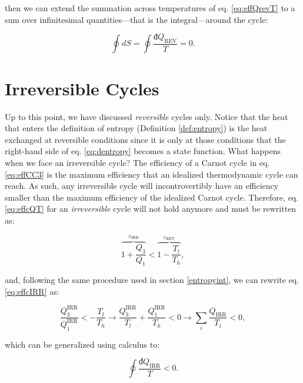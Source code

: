 \documentclass[
  9pt,
]{extbook}
\theoremstyle{definition}
\theoremstyle{definition}
\theoremstyle{definition}
\theoremstyle{remark}
\begin{document}
then we can extend the summation across temperatures of eq. \eqref{eq:effQrevT} to a sum over infinitesimal quantities---that is the integral---around the cycle:

\begin{equation}
\oint dS = \oint \frac{đQ_{\mathrm{REV}}}{T} = 0.
\label{eq:ds0}
\end{equation}

\hypertarget{irreversible-cycles}{%
\section{Irreversible Cycles}\label{irreversible-cycles}}

Up to this point, we have discussed \emph{reversible} cycles only. Notice that the heat that enters the definition of entropy (Definition \ref{def:entropy}) is the heat exchanged at reversible conditions since it is only at those conditions that the right-hand side of eq. \eqref{eq:dentropy} becomes a state function. What happens when we face an irreversible cycle? The efficiency of a Carnot cycle in eq. \eqref{eq:effCC3} is the maximum efficiency that an idealized thermodynamic cycle can reach. As such, any irreversible cycle will incontrovertibly have an efficiency smaller than the maximum efficiency of the idealized Carnot cycle. Therefore, eq. \eqref{eq:effcQT} for an \emph{irreversible} cycle will not hold anymore and must be rewritten as:

\begin{equation}
\overbrace{1+\frac{Q_3}{Q_1}}^{\varepsilon_{\mathrm{IRR}}} < \overbrace{1-\frac{T_l}{T_h}}^{\varepsilon_{\mathrm{REV}}},
\label{eq:effcIRR}
\end{equation}

and, following the same procedure used in section \ref{entropyint}, we can rewrite eq. \eqref{eq:effcIRR} as:

\begin{equation}
\frac{Q^{\text{IRR}}_3}{Q^{\text{IRR}}_1} < - \frac{T_l}{T_h} \longrightarrow \frac{Q^{\text{IRR}}_3}{T_l} + \frac{Q^{\text{IRR}}_1}{T_h} < 0 \longrightarrow \sum_i \frac{Q_{\text{IRR}}}{T_i} < 0,
\label{eq:effcIRR2}
\end{equation}

which can be generalized using calculus to:

\begin{equation}
\oint \frac{đQ_{\mathrm{IRR}}}{T} < 0.
\label{eq:dqirrineq}
\end{equation}
\end{document}
